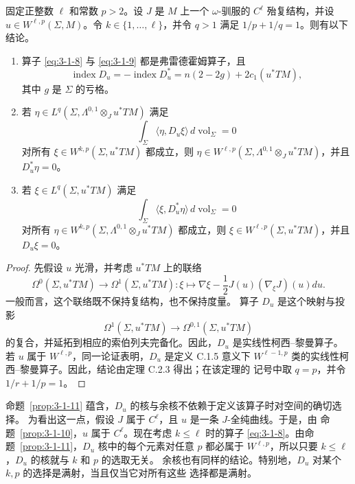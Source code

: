 \begin{proposition}\label{prop:3-1-11}
固定正整数 $\ell$ 和常数 $p>2$。设 $J$ 是 $M$ 上一个 $\omega$-驯服的
$C^\ell$ 殆复结构，并设 $u\in W^{\ell,p}(\Sigma,M)$。令
$k\in\{1,\ldots,\ell\}$，并令 $q>1$ 满足 $1/p+1/q=1$。则有以下结论。
\begin{enumerate}[label=(\roman*),leftmargin=3em]
  \item 算子 \eqref{eq:3-1-8} 与 \eqref{eq:3-1-9} 都是弗雷德霍姆算子，且
  \[
    \operatorname{index}D_u
    =-\operatorname{index}D_u^*
    =n(2-2g)+2c_1(u^*TM),
  \]
  其中 $g$ 是 $\Sigma$ 的亏格。

  \item 若
  $\eta\in L^q(\Sigma,\Lambda^{0,1}\otimes_Ju^*TM)$ 满足
  \[
    \int_\Sigma\langle\eta,D_u\xi\rangle
    \,d\operatorname{vol}_\Sigma=0
  \]
  对所有 $\xi\in W^{k,p}(\Sigma,u^*TM)$ 都成立，则
  $\eta\in W^{\ell,p}(\Sigma,\Lambda^{0,1}\otimes_Ju^*TM)$，并且
  $D_u^*\eta=0$。

  \item 若 $\xi\in L^q(\Sigma,u^*TM)$ 满足
  \[
    \int_\Sigma\langle\xi,D_u^*\eta\rangle
    \,d\operatorname{vol}_\Sigma=0
  \]
  对所有
  $\eta\in W^{k,p}(\Sigma,\Lambda^{0,1}\otimes_Ju^*TM)$ 都成立，则
  $\xi\in W^{\ell,p}(\Sigma,u^*TM)$，并且 $D_u\xi=0$。
\end{enumerate}
\end{proposition}

\begin{proof}
先假设 $u$ 光滑，并考虑 $u^*TM$ 上的联络
\[
  \Omega^0(\Sigma,u^*TM)\longrightarrow\Omega^1(\Sigma,u^*TM):
  \xi\longmapsto
  \nabla\xi-\frac12J(u)(\nabla_\xi J)(u)du.
\]
一般而言，这个联络既不保持复结构，也不保持度量。
算子 $D_u$ 是这个映射与投影
\[
  \Omega^1(\Sigma,u^*TM)
  \longrightarrow\Omega^{0,1}(\Sigma,u^*TM)
\]
的复合，并延拓到相应的索伯列夫完备化。因此，$D_u$ 是实线性柯西--黎曼算子。
若 $u$ 属于 $W^{\ell,p}$，同一论证表明，$D_u$ 是定义 C.1.5 意义下
$W^{\ell-1,p}$ 类的实线性柯西--黎曼算子。因此，结论由定理 C.2.3 得出；在该定理的
记号中取 $q=p$，并令 $1/r+1/p=1$。
\end{proof}

命题~\ref{prop:3-1-11} 蕴含，$D_u$ 的核与余核不依赖于定义该算子时对空间的确切选择。
为看出这一点，假设 $J$ 属于 $C^\ell$，且 $u$ 是一条 $J$-全纯曲线。于是，由
命题~\ref{prop:3-1-10}，$u$ 属于 $C^\ell$。现在考虑 $k\le\ell$ 时的算子
\eqref{eq:3-1-8}。由命题~\ref{prop:3-1-11}，$D_u$ 核中的每个元素对任意 $p$
都必属于 $W^{\ell,p}$，所以只要 $k\le\ell$，$D_u$ 的核就与 $k$ 和 $p$ 的选取无关。
余核也有同样的结论。特别地，$D_u$ 对某个 $k,p$ 的选择是满射，当且仅当它对所有这些
选择都是满射。
